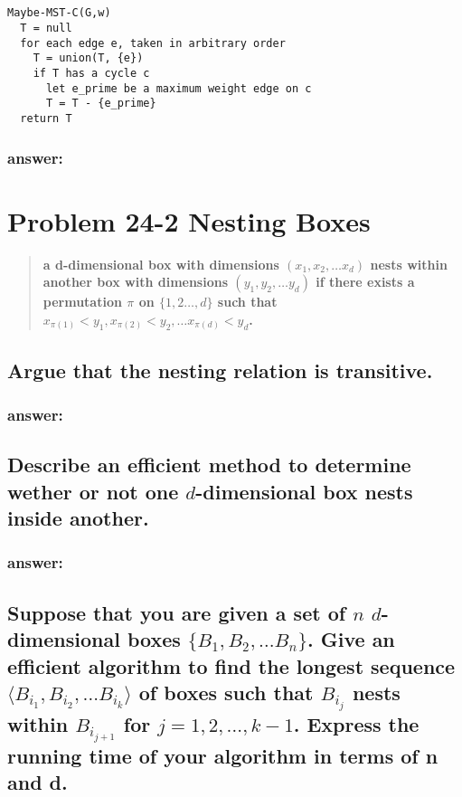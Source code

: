 \documentclass[titlepage]{article}\usepackage[]{graphicx}\usepackage[]{color}
\begin{document}
\subsection{}
\begin{lstlisting}
Maybe-MST-C(G,w)
  T = null
  for each edge e, taken in arbitrary order
	T = union(T, {e})
	if T has a cycle c
	  let e_prime be a maximum weight edge on c
	  T = T - {e_prime}
  return T
\end{lstlisting}
\subsubsection{answer:}

\vspace{8cm}

\section{Problem 24-2 Nesting Boxes}
\begin{quote}
  \textbf{a d-dimensional box with dimensions $(x_1, x_2, \dots x_d)$
	\textbf{nests} within another box with dimensions $(y_1, y_2, \dots y_d)$
	if there exists a permutation $\pi$ on $\{1,2\dots,d\}$ such that 
	$ x_{\pi(1)} < y_1, x_{\pi(2)} < y_2, \dots x_{\pi(d)} < y_d$.  }
\end{quote}

\subsection{Argue that the nesting relation is transitive.}
\subsubsection{answer:}
\vspace{5cm}


\subsection{Describe an efficient method to determine wether or not one
$d$-dimensional box nests inside another.}
\subsubsection{answer:}
\vspace{5cm}



\subsection{Suppose that you are given a set of $n$ $d$-dimensional boxes
  $\{B_1, B_2,\dots B_n\}$. Give an efficient algorithm to find the longest
  sequence $\langle B_{i_1}, B_{i_2},\dots B_{i_k}\rangle$ of boxes such that
  $B_{i_j}$ nests within  
  $B_{i_{j+1}}$ for $j = 1,2,\dots,k-1$. Express the running time of your
algorithm in terms of n and d.}
\end{document}

